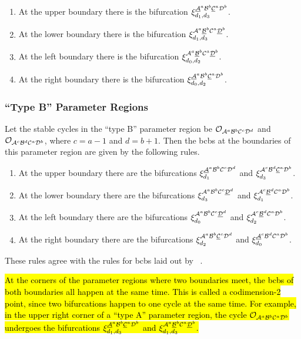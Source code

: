 \begin{enumerate}
	\item At the upper boundary there is the bifurcation $\xi_{d_1, d_3}^{\underline{\mathcal{A}}^a\mathcal{B}^b\underline{\mathcal{C}}^a\mathcal{D}^b}$.
	\item At the lower boundary there is the bifurcation $\xi_{d_1, d_3}^{\mathcal{A}^a\underline{\mathcal{B}}^b\mathcal{C}^a\underline{\mathcal{D}}^b}$.
	\item At the left boundary there is the bifurcation $\xi_{d_0, d_2}^{\mathcal{A}^a\underline{\mathcal{B}}^b\mathcal{C}^a\underline{\mathcal{D}}^b}$.
	\item At the right boundary there is the bifurcation $\xi_{d_0, d_2}^{\underline{\mathcal{A}}^a\mathcal{B}^b\underline{\mathcal{C}}^a\mathcal{D}^b}$.
\end{enumerate}

\subsubsection{``Type B'' Parameter Regions}

Let the stable cycles in the ``type B'' parameter region be $\mathcal{O}_{\mathcal{A}^a\mathcal{B}^b\mathcal{C}^c\mathcal{D}^d}$ and $\mathcal{O}_{\mathcal{A}^c\mathcal{B}^d\mathcal{C}^a\mathcal{D}^b}$, where $c = a - 1$ and $d = b + 1$.
Then the \glspl{bcb} at the boundaries of this parameter region are given by the following rules.

\begin{enumerate}
	\item At the upper boundary there are the bifurcations $\xi_{d_1}^{\underline{\mathcal{A}}^a\mathcal{B}^b\mathcal{C}^c\mathcal{D}^d}$ and $\xi_{d_3}^{\mathcal{A}^c\mathcal{B}^d\underline{\mathcal{C}}^a\mathcal{D}^b}$.
	\item At the lower boundary there are the bifurcations $\xi_{d_3}^{\mathcal{A}^a\mathcal{B}^b\mathcal{C}^c\underline{\mathcal{D}}^d}$ and $\xi_{d_1}^{\mathcal{A}^c\underline{\mathcal{B}}^d\mathcal{C}^a\mathcal{D}^b}$.
	\item At the left boundary there are the bifurcations $\xi_{d_0}^{\mathcal{A}^a\mathcal{B}^b\mathcal{C}^c\underline{\mathcal{D}}^d}$ and $\xi_{d_2}^{\mathcal{A}^c\underline{\mathcal{B}}^d\mathcal{C}^a\mathcal{D}^b}$.
	\item At the right boundary there are the bifurcations $\xi_{d_2}^{\mathcal{A}^a\mathcal{B}^b\underline{\mathcal{C}}^c\mathcal{D}^d}$ and $\xi_{d_0}^{\underline{\mathcal{A}}^c\mathcal{B}^d\mathcal{C}^a\mathcal{D}^b}$.
\end{enumerate}

These rules agree with the rules for \glspl{bcb} laid out by ~\cite{akyuz2022}.

\hl{
At the corners of the parameter regions where two boundaries meet, the \glspl{bcb} of both boundaries all happen at the same time.
This is called a codimension-2 point, since two bifurcations happen to one cycle at the same time.
For example, in the upper right corner of a ``type A'' parameter region, the cycle $\mathcal{O}_{\mathcal{A}^a\mathcal{B}^b\mathcal{C}^a\mathcal{D}^b}$ undergoes the bifurcations $\xi_{d_1, d_3}^{\underline{\mathcal{A}}^a\mathcal{B}^b\underline{\mathcal{C}}^a\mathcal{D}^b}$ and $\xi_{d_1, d_3}^{\mathcal{A}^a\underline{\mathcal{B}}^b\mathcal{C}^a\underline{\mathcal{D}}^b}$.
}

